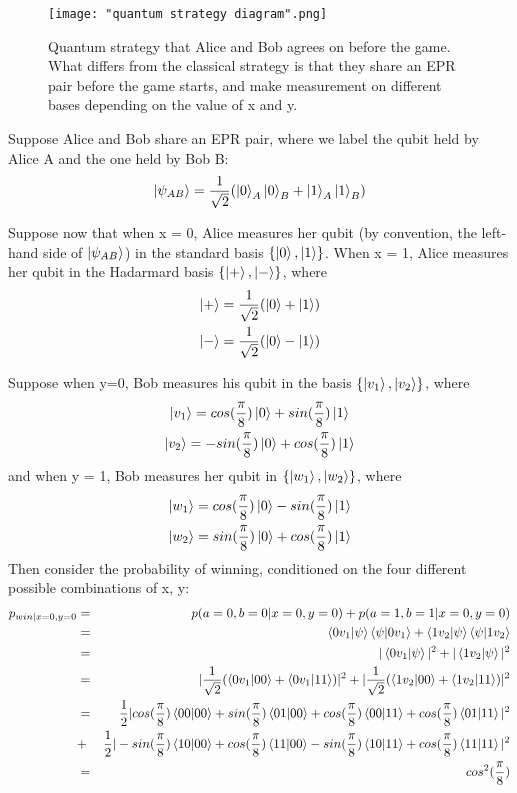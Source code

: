 \begin{figure}[h]
    \centering
    \texttt{[image: "quantum strategy diagram".png]}
    \caption{Quantum strategy that Alice and Bob agrees on before the game. What differs from the classical strategy is that they share an EPR pair before the game starts, and make measurement on different bases depending on the value of x and y.}
    \label{fig: quantum strategy diagram}
\end{figure}

Suppose Alice and Bob share an EPR pair, where we label the qubit held by Alice A and the one held by Bob B: 
\begin{equation*}
    \ket{\psi_{AB}}=\frac{1}{\sqrt{2}}(\ket{0}_A \ket{0}_B+\ket{1}_A \ket{1}_B)
\end{equation*}

Suppose now that when x = 0, Alice measures her qubit (by convention, the left-hand side of $\ket{\psi_{AB}}$) in the standard basis $\{\ket{0}, \ket{1}\}$. When x = 1, Alice measures her qubit in the Hadarmard basis $\{\ket{+}, \ket{-}\}$, where
\begin{gather*}
    \ket{+}=\frac{1}{\sqrt{2}}(\ket{0}+\ket{1})\\
    \ket{-}=\frac{1}{\sqrt{2}}(\ket{0}-\ket{1})
\end{gather*}

Suppose when y=0, Bob measures his qubit in the basis $\{\ket{v_1}, \ket{v_2}\}$, where
\begin{gather*}
    \ket{v_1}=cos(\frac{\pi}{8})\ket{0}+sin(\frac{\pi}{8})\ket{1}\\
    \ket{v_2}=-sin(\frac{\pi}{8})\ket{0}+cos(\frac{\pi}{8})\ket{1}  
\end{gather*}
and when y = 1, Bob measures her qubit in $\{\ket{w_1}, \ket{w_2}\}$, where
\begin{gather*}
    \ket{w_1}=cos(\frac{\pi}{8})\ket{0}-sin(\frac{\pi}{8})\ket{1}\\
    \ket{w_2}=sin(\frac{\pi}{8})\ket{0}+cos(\frac{\pi}{8})\ket{1}
    \end{gather*}
Then consider the probability of winning, conditioned on the four different possible combinations of x, y:
\begin{eqnarray*}
p_{win|x=0,y=0}&=&p(a=0, b=0|x=0, y=0)+p(a=1, b=1|x=0, y=0)\\
&=&\braket{0 v_1|\psi}\braket{\psi|0v_1}+\braket{1 v_2|\psi}\braket{\psi|1v_2}\\
&=&|\braket{0 v_1|\psi}|^2 + |\braket{1 v_2|\psi}|^2\\
&=&|\frac{1}{\sqrt{2}}(\braket{0v_1|00}+\braket{0v_1|11})|^2+|\frac{1}{\sqrt{2}}(\braket{1v_2|00}+\braket{1v_2|11})|^2\\
&=&\frac{1}{2}|cos(\frac{\pi}{8})\braket{00|00}+sin(\frac{\pi}{8})\braket{01|00}+cos(\frac{\pi}{8})\braket{00|11}+cos(\frac{\pi}{8})\braket{01|11}|^2\\
&+&\frac{1}{2}|-sin(\frac{\pi}{8})\braket{10|00}+cos(\frac{\pi}{8})\braket{11|00}-sin(\frac{\pi}{8})\braket{10|11}+cos(\frac{\pi}{8})\braket{11|11}|^2\\
&=&cos^2(\frac{\pi}{8})
\end{eqnarray*}

